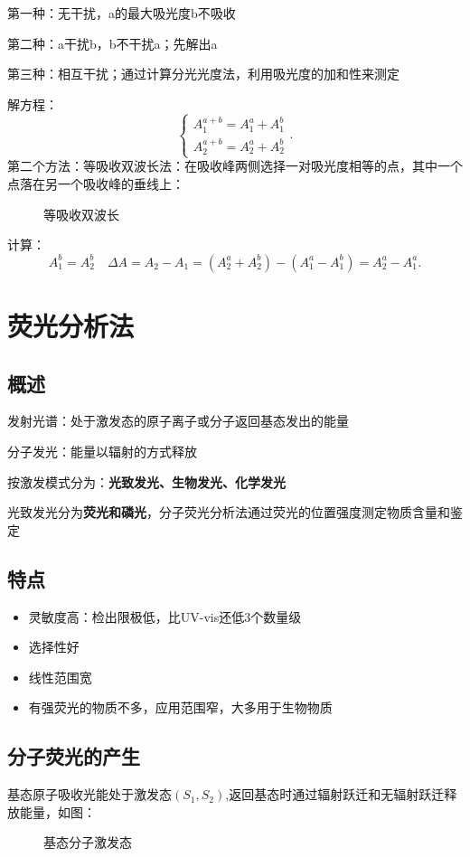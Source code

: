 第一种：无干扰，a的最大吸光度b不吸收

第二种：a干扰b，b不干扰a；先解出a

第三种：相互干扰；通过计算分光光度法，利用吸光度的加和性来测定

解方程：
\[
    \begin{cases}
        A_1^{a+b} = A_1^{a}+A_1^{b}\\
        A_2^{a+b} = A_2^{a}+A_2^{b}
    \end{cases}
.\]
第二个方法：等吸收双波长法：在吸收峰两侧选择一对吸光度相等的点，其中一个点落在另一个吸收峰的垂线上：
\begin{figure}[ht!]
    \centering
    \caption{等吸收双波长}
    \label{fig:等吸收双波长}
\end{figure}

计算：\[
    A_1^{b} = A_2^{b}\quad \Delta A = A_2-A_1 = \left( A_2^{a}+A_2^{b} \right)-\left( A_1^{a}-A_1^{b} \right) = A_2^{a}-A_1^{a}
.\]
\section{荧光分析法}%
\label{sec:荧光分析法}
\subsection{概述}%
\label{sub:概述}
\begin{defi}
    发射光谱：处于激发态的原子离子或分子返回基态发出的能量
\end{defi}
分子发光：能量以辐射的方式释放
\begin{notation}
    按激发模式分为：\textbf{光致发光、生物发光、化学发光}
\end{notation}
光致发光分为\textbf{荧光和磷光}，分子荧光分析法通过荧光的位置强度测定物质含量和鉴定
\subsection{特点}%
\label{sub:特点}
\begin{itemize}
    \item 灵敏度高：检出限极低，比UV-vis还低3个数量级
    \item 选择性好
    \item 线性范围宽
    \item 有强荧光的物质不多，应用范围窄，大多用于生物物质
\end{itemize}
\subsection{分子荧光的产生}%
\label{sub:分子荧光的产生}
基态原子吸收光能处于激发态$\left( S_1,S_2 \right)$,返回基态时通过辐射跃迁和无辐射跃迁释放能量，如图：
\begin{figure}[ht!]
    \centering
    \caption{基态分子激发态}
    \label{fig:基态分子激发态}
\end{figure}

